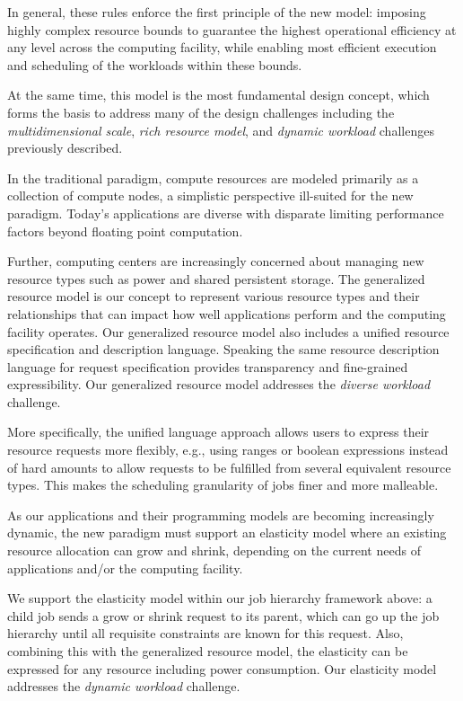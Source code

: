 In general, these rules enforce the first principle 
of the new model: imposing highly complex resource bounds 
to guarantee the highest operational efficiency 
at any level across the computing facility, while enabling 
most efficient execution and scheduling of the workloads 
within these bounds. 

At the same time, this model is the most fundamental 
design concept, which forms the basis to address 
many of the design challenges including 
the {\em multidimensional scale}, {\em rich resource model},
and {\em dynamic workload} challenges previously described.

\vspace{1ex}
 In the traditional 
paradigm, compute resources are modeled primarily 
as a collection of compute nodes, a simplistic perspective 
ill-suited for the new paradigm. Today's applications 
are diverse with disparate limiting performance factors 
beyond floating point computation. 

Further, computing centers are increasingly concerned 
about managing new resource types such as power 
and shared persistent storage. The generalized resource 
model is our concept to represent various resource types 
and their relationships that can impact how well applications 
perform and the computing facility operates. 
Our generalized resource model also includes a unified 
resource specification and description language. 
Speaking the same resource description language 
for request specification provides transparency and 
fine-grained expressibility. Our generalized resource 
model addresses the {\em diverse workload} challenge.

More specifically, the unified language approach 
allows users to express their resource requests 
more flexibly, e.g., using ranges or boolean 
expressions instead of hard amounts to allow requests 
to be fulfilled from several equivalent resource types. 
This makes the scheduling granularity 
of jobs finer and more malleable.

\vspace{1ex}
 As our 
applications and their programming models are becoming 
increasingly dynamic, the new paradigm must support 
an elasticity model where an existing resource allocation 
can grow and shrink, depending on the current needs 
of applications and/or the computing facility. 

We support the elasticity model within our job hierarchy 
framework above: a child job sends a grow or shrink request 
to its parent, which can go up the job hierarchy 
until all requisite constraints are known for this request. 
Also, combining this with the generalized resource model, 
the elasticity can be expressed for any resource including 
power consumption. Our elasticity model addresses 
the {\em dynamic workload} challenge.

